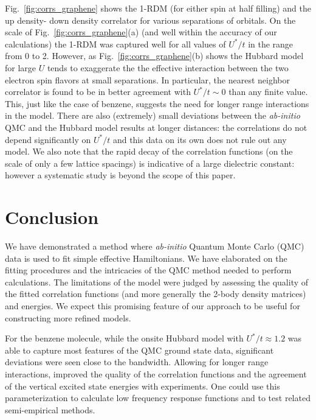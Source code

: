 \documentclass[aip,jcp,twocolumn,10pt]{revtex4-1}
\begin{document}
Fig.~\ref{fig:corrs_graphene} shows the 1-RDM (for either spin at half filling) and the 
up density- down density correlator for various separations of orbitals. 
On the scale of Fig.~\ref{fig:corrs_graphene}(a) 
(and well within the accuracy of our calculations) the 1-RDM was captured 
well for all values of $U^{*}/t$ in the range from 0 to 2. However, as 
Fig.~\ref{fig:corrs_graphene}(b) shows the Hubbard model for large $U$ tends 
to exaggerate the the effective interaction 
between the two electron spin flavors at small separations. In particular, the 
nearest neighbor correlator is found to be in better agreement with $U^{*}/t \sim 0$ 
than any finite value. This, just like the case of benzene, suggests the need 
for longer range interactions in the model. 
There are also (extremely) small deviations between the \emph{ab-initio} QMC and the Hubbard model results 
at longer distances: the correlations do not depend significantly on $U^{*}/t$ and 
this data on its own does not rule out any model.
We also note that the rapid decay of the correlation functions (on the scale of only a 
few lattice spacings) is indicative of a large dielectric constant: however a systematic study 
is beyond the scope of this paper.
 
\section{Conclusion} 
We have demonstrated a method where \emph{ab-initio} Quantum Monte Carlo (QMC) 
data is used to fit simple effective Hamiltonians. We have elaborated 
on the fitting procedures and the intricacies of the QMC method 
needed to perform calculations. The limitations of the model 
were judged by assessing the quality of the fitted 
correlation functions (and more generally the 2-body density matrices) 
and energies. We expect this promising feature of our approach 
to be useful for constructing more refined models. 

For the benzene molecule, while 
the onsite Hubbard model with $U^{*}/t \approx 1.2$ 
was able to capture most features of the QMC ground state data, 
significant deviations were seen close to the bandwidth.
Allowing for longer range interactions, improved 
the quality of the correlation functions and the 
agreement of the vertical excited state energies 
with experiments. One could use this parameterization to calculate 
low frequency response functions and to test related 
semi-empirical methods.
\end{document}
